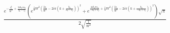\documentclass{article}
\begin{document}
$ \frac{e^{-\frac{ z_c ^2}{W^2}+\frac{2 i k_0 \pi  z_0}{z_0-z_f}} \left(e^{\frac{1}{4} W^2 \left(\frac{2 z_c}{W^2}-2i \pi  \left(k+\frac{k_0}{z_0-z_f}\right)\right)^2}+e^{\frac{4 i k_0 \pi  z_0}{-z_0+z_f}+\frac{1}{4} W^2\left(\frac{2 z_c}{W^2}-2 i \pi  \left(k+\frac{k_0}{-z_0+z_f}\right)\right)^2}\right) \sqrt{\pi }}{2 \sqrt{\frac{1}{W^2}}}$
\end{document}
